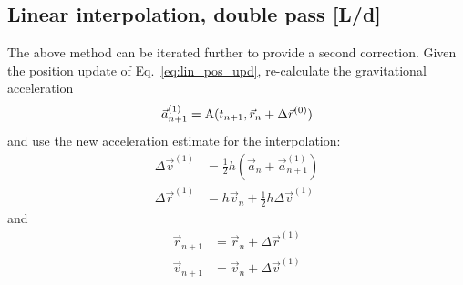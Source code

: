 \documentclass[a4paper]{article}
\begin{document}
\subsection{Linear interpolation, double pass [L/d]}
The above method can be iterated further to provide a second correction. Given the position update of Eq.~\ref{eq:lin_pos_upd}, re-calculate the gravitational acceleration
\begin{equation*}
\vec{a}_{n+1}^{(1)} = \mathrm{A}(t_{n+1},\vec{r}_n+\Delta\vec{r}^{(0)})
\end{equation*}
and use the new acceleration estimate for the interpolation:
\begin{equation*}
\begin{split}
\Delta\vec{v}^{(1)} &= \frac{1}{2}h (\vec{a}_n+\vec{a}_{n+1}^{(1)}) \\
\Delta\vec{r}^{(1)} &= h\vec{v}_n + \frac{1}{2}h\Delta\vec{v}^{(1)}
\end{split}
\end{equation*}
and
\begin{equation*}
\begin{split}
\vec{r}_{n+1} &= \vec{r}_n + \Delta\vec{r}^{(1)} \\
\vec{v}_{n+1} &= \vec{v}_n + \Delta\vec{v}^{(1)}
\end{split}
\end{equation*}
\end{document}
